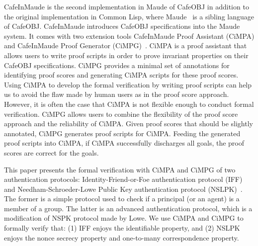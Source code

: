 \documentclass[10pt, conference, compsocconf]{IEEEtran}
\begin{document}
	
	CafeInMaude is the second implementation in Maude of CafeOBJ in addition to the original implementation in Common Lisp, where Maude~\cite{ClavelEtal2007maude} is a sibling language of CafeOBJ.
	CafeInMaude introduces CafeOBJ specifications into the Maude system. 
	It comes with two extension tools  CafeInMaude Proof Assistant (CiMPA) and CafeInMaude Proof Generator (CiMPG)~\cite{RiescoO18tosem}. 
	CiMPA is a proof assistant that allows users to write proof scripts in order to prove invariant properties on their CafeOBJ specifications. CiMPG provides a minimal set of annotations for identifying proof scores and generating CiMPA scripts for these proof scores. 
	Using CiMPA to develop the formal verification by writing proof scripts can help us to avoid the flaw made by human users as in the proof score approach. 
	However, it is often the case that CiMPA is not flexible enough to conduct formal verification.
	CiMPG allows users to combine the flexibility of the proof score approach and the reliability of CiMPA. Given proof scores that should be slightly annotated, CiMPG generates proof scripts for CiMPA. Feeding the generated proof scripts into CiMPA, if CiMPA successfully discharges all goals, the proof scores are correct for the goals. 
	
	This paper presents the formal verification with CiMPA and CiMPG of two authentication protocols: Identity-Friend-or-Foe authentication protocol (IFF)~\cite{iff2001} and Needham-Schroeder-Lowe Public Key authentication protocol (NSLPK)~\cite{nslpk95}.
	The former is a simple protocol used to check if a principal (or an agent) is a member of a group.
	The latter is an advanced authentication protocol, which is a modification of NSPK protocol \cite{nspk78} made by Lowe.
	We use CiMPA and CiMPG to formally verify that: (1) IFF enjoys the identifiable property, and (2) NSLPK enjoys the nonce secrecy property and one-to-many correspondence property.
	
	
\end{document}
